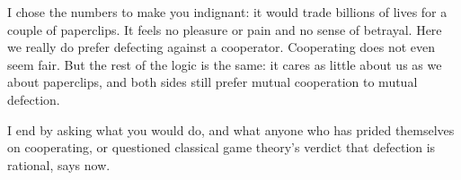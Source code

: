 I chose the numbers to make you indignant: it would trade billions of lives for a couple of paperclips. It feels no pleasure or pain and no sense of betrayal. Here we really do prefer defecting against a cooperator. Cooperating does not even seem fair. But the rest of the logic is the same: it cares as little about us as we about paperclips, and both sides still prefer mutual cooperation to mutual defection.

I end by asking what you would do, and what anyone who has prided themselves on cooperating, or questioned classical game theory's verdict that defection is rational, says now. 
